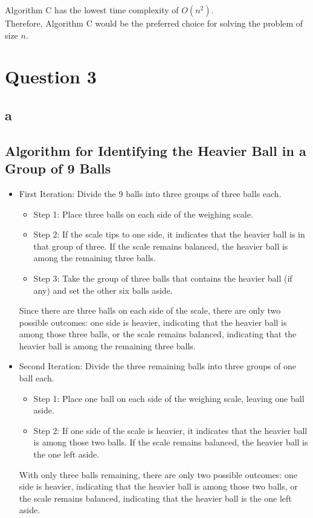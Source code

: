 \documentclass{article}
\begin{document}
Algorithm C has the lowest time complexity of \( O(n^2) \). \\

Therefore, Algorithm C would be the preferred choice for solving the problem of size \( n \).
\newpage
\section*{Question 3}
\subsection*{a}
\subsection*{Algorithm for Identifying the Heavier Ball in a Group of 9 Balls}

\begin{itemize}
    \item First Iteration: Divide the 9 balls into three groups of three balls each.

          \begin{itemize}
              \item Step 1: Place three balls on each side of the weighing scale.
              \item Step 2: If the scale tips to one side, it indicates that the heavier ball is in that group of three. If the scale remains balanced, the heavier ball is among the remaining three balls.
              \item Step 3: Take the group of three balls that contains the heavier ball (if any) and set the other six balls aside.
          \end{itemize}

          Since there are three balls on each side of the scale, there are only two possible outcomes: one side is heavier, indicating that the heavier ball is among those three balls, or the scale remains balanced, indicating that the heavier ball is among the remaining three balls.

    \item Second Iteration: Divide the three remaining balls into three groups of one ball each.

          \begin{itemize}
              \item Step 1: Place one ball on each side of the weighing scale, leaving one ball aside.
              \item Step 2: If one side of the scale is heavier, it indicates that the heavier ball is among those two balls. If the scale remains balanced, the heavier ball is the one left aside.
          \end{itemize}

          With only three balls remaining, there are only two possible outcomes: one side is heavier, indicating that the heavier ball is among those two balls, or the scale remains balanced, indicating that the heavier ball is the one left aside.

\end{itemize}
\end{document}

